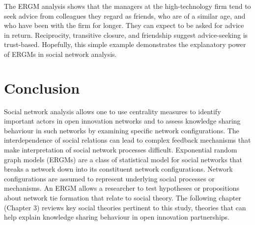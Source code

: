 The ERGM analysis shows that the managers at the high-technology firm tend to seek advice from colleagues they regard as friends, who are of a similar age, and who have been with the firm for longer. They can expect to be asked for advice in return. Reciprocity, transitive closure, and friendship suggest advice-seeking is trust-based. Hopefully, this simple example demonstrates the explanatory power of ERGMs in social network analysis. \medskip

\section{Conclusion}

Social network analysis allows one to use centrality measures to identify important actors in open innovation networks and to assess knowledge sharing behaviour in such networks by examining specific network configurations. The interdependence of social relations can lead to complex feedback mechanisms that make interpretation of social network processes difficult. Exponential random graph models (ERGMs) are a class of statistical model for social networks that breaks a network down into its constituent network configurations. Network configurations are assumed to represent underlying social processes or mechanisms. An ERGM allows a researcher to test hypotheses or propositions about network tie formation that relate to social theory. The following chapter (Chapter 3) reviews key social theories pertinent to this study, theories that can help explain knowledge sharing behaviour in open innovation partnerships. 